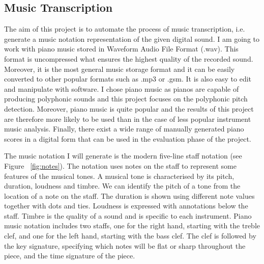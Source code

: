 \documentclass[11pt]{article} %
\begin{document}
\subsection{Music Transcription}
The aim of this project is to automate the process of music transcription, i.e. generate a music notation representation of the given digital sound. I am going to work with piano music stored in Waveform Audio File Format (.wav). This format is uncompressed what ensures the highest quality of the recorded sound. Moreover, it is the most general music storage format and it can be easily converted to other popular formats such as .mp3 or .gsm. It is also easy to edit and manipulate with software. I chose piano music as pianos are capable of producing polyphonic sounds and this project focuses on the polyphonic pitch detection. Moreover, piano music is quite popular and the results of this project are therefore more likely to be used than in the case of less popular instrument music analysis. Finally, there exist a wide range of manually generated piano scores in a digital form that can be used in the evaluation phase of the project. 

The music notation I will generate is the modern five-line staff notation (see Figure ~\ref{fig:notes}). The notation uses notes on the staff to represent some features of the musical tones. A musical tone is characterised by its pitch, duration, loudness and timbre. We can identify the pitch of a tone from the location of a note on the staff. The duration is shown using different note values together with dots and ties. Loudness is expressed with annotations below the staff. Timbre is the quality of a sound and is specific to each instrument. Piano music notation includes two staffs, one for the right hand, starting with the treble clef, and one for the left hand, starting with the bass clef. The clef is followed by the key signature, specifying which notes will be flat or sharp throughout the piece, and the time signature of the piece.
\end{document}
